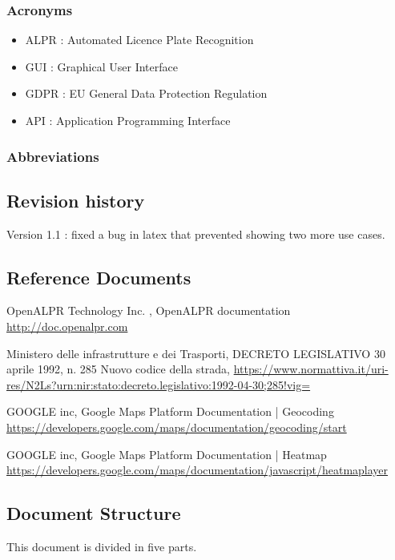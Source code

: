 \subsubsection{Acronyms}
\begin{itemize}
  \item ALPR : Automated Licence Plate Recognition
  \item GUI : Graphical User Interface
  \item GDPR : EU General Data Protection Regulation
  \item API : Application Programming Interface
\end{itemize}

\subsubsection{Abbreviations}


\subsection{Revision history}
Version 1.1 : fixed a bug in latex that prevented showing two more use cases.


\subsection{Reference Documents}
\begin{thebibliography}{00}
OpenALPR Technology Inc. ,
OpenALPR documentation \url{http://doc.openalpr.com}

 Ministero delle infrastrutture e dei Trasporti,
DECRETO LEGISLATIVO 30 aprile 1992, n. 285 Nuovo codice della strada,
 \url{https://www.normattiva.it/uri-res/N2Ls?urn:nir:stato:decreto.legislativo:1992-04-30;285!vig=}

 GOOGLE inc,
 Google Maps Platform Documentation | Geocoding
 \url{https://developers.google.com/maps/documentation/geocoding/start}

 GOOGLE inc,
 Google Maps Platform Documentation | Heatmap
 \url{https://developers.google.com/maps/documentation/javascript/heatmaplayer}

\end{thebibliography}

\subsection{Document Structure}
This document is divided in five parts.

